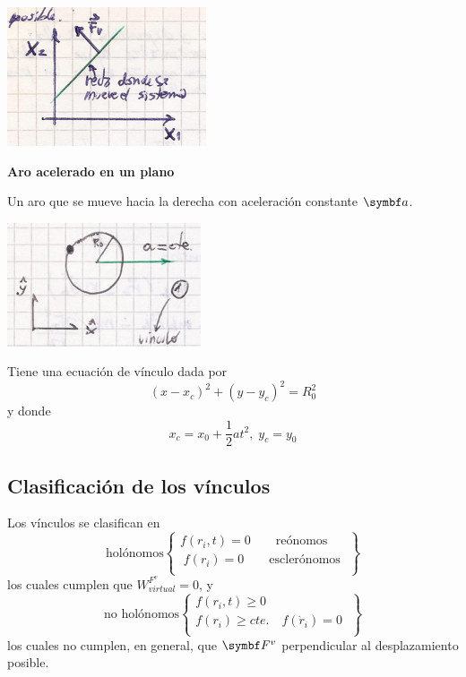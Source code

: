 \documentclass[10pt,oneside]{CBFT_book}
\begin{document}
\includegraphics[scale=0.35]{images/fig_mc_problema_bloques_fases.jpg}

\begin{ejemplo}{\bf Aro acelerado en un plano}

Un aro que se mueve hacia la derecha con aceleración constante $\vb{a}$. 

\includegraphics[scale=0.25]{images/fig_mc_aro_acelerado.jpg}

Tiene una ecuación de vínculo dada por 
\[
	(x-x_c)^2 + (y-y_c)^2 = R_0^2
\]
y donde 
\[
	x_c = x_0 + \frac 1 2 a t^2, \; y_c = y_0
\]
\end{ejemplo}

\subsection{Clasificación de los vínculos}

Los vínculos se clasifican en
\[
\textrm{holónomos} 
\begin{Bmatrix}
 f(r_i,t) = 0 \qquad \textrm{reónomos} \\
\; f(r_i) = 0 \qquad \textrm{esclerónomos} \;\\
\end{Bmatrix} 
\]
los cuales cumplen que  $W_{virtual}^{F^v}=0$, y
\[
\textrm{no holónomos} 
\begin{Bmatrix}
 f(r_i,t) \geq 0  \\
 f(r_i) \geq cte. \quad f(\dot{r}_i) = 0  \; \\
\end{Bmatrix}
\]
los cuales no cumplen, en general, que $\vb{F}^v$ perpendicular al desplazamiento posible.
\end{document}
